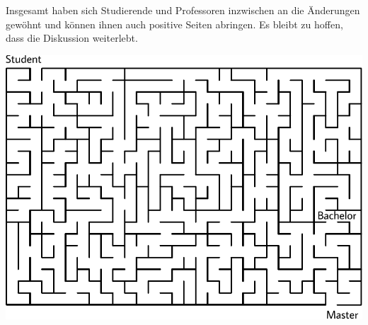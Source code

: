 \begin{multicols}{2}
Insgesamt haben sich Studierende und Professoren inzwischen an die Änderungen gewöhnt und können ihnen auch positive Seiten abringen.
Es bleibt zu hoffen, dass die Diskussion weiterlebt.

\end{multicols}

\begin{center}
	\includegraphics[width=\textwidth, height=0.38\textheight]{res/bachelor_master_labyrinth.pdf}
\end{center}
